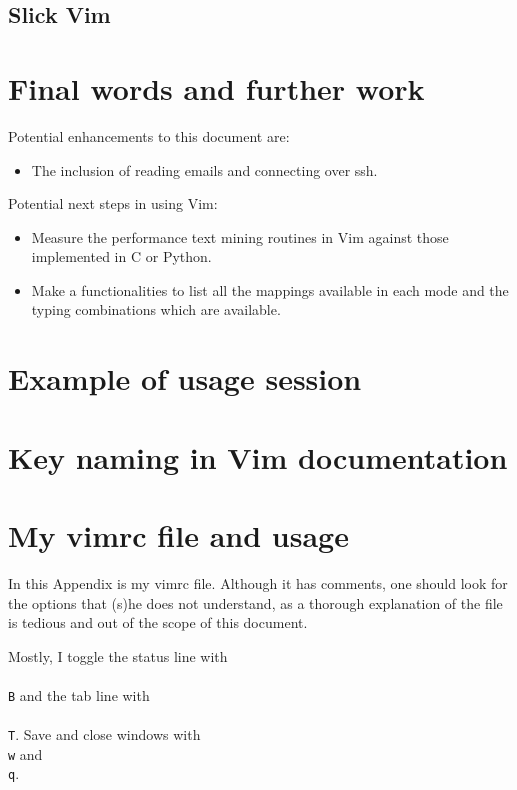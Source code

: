 \documentclass{article}
\begin{document}
\subsection{Slick Vim}

\section{Final words and further work}

Potential enhancements to this document are:
\begin{itemize}
  \item The inclusion of reading emails and connecting over ssh.
\end{itemize}

Potential next steps in using Vim:
\begin{itemize}
  \item Measure the performance text mining routines in Vim against those implemented in C or Python.
  \item Make a functionalities to list all the mappings available in each mode and the typing combinations which are available.
\end{itemize}



\appendix
\section{Example of usage session}
\section{Key naming in Vim documentation}
\section{My vimrc file and usage}
In this Appendix is my vimrc file.
Although it has comments, one should
look for the options that (s)he does
not understand, as a thorough explanation
of the file is tedious and out of the scope
of this document.

Mostly, I toggle the status line with \texttt{\\\\B}
and the tab line with \texttt{\\\\T}.
Save and close windows with \texttt{\\w} and \texttt{\\q}.
\end{document}

